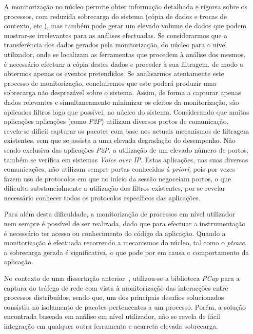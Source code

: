A monitorização no núcleo permite obter informação detalhada e rigorsa sobre os processos, com reduzida sobrecarga do sistema (cópia de dados e trocas de contexto, etc.), mas também pode gerar um elevado volume de dados que podem mostrar-se irrelevantes para as análises efectuadas.
Se considerarmos que a transferência dos dados gerados pela monitorização, do núcleo para o nível utilizador, onde se localizam as ferramentas que procedem à análise dos mesmos, é necessário efectuar a cópia destes dados e proceder à sua filtragem, de modo a obtermos apenas os eventos pretendidos.
Se analisarmos atentamente este processo de monitorização, concluiremos que este poderá produzir uma sobrecarga não desprezável sobre o sistema.
Assim, de forma a capturar apenas dados relevantes e simultaneamente minimizar os efeitos da monitorização, são aplicados filtros logo que possível, no núcleo do sistema.
Considerando que muitas aplicações aplicações (como \textit{P2P}) utilizam diversos portos de comunicação, revela-se difícil capturar os pacotes com base nos actuais mecanismos de filtragem existentes, sem que se assista a uma elevada degradação do desempenho.
Não sendo exclusiva das aplicações \textit{P2P}, a utilização de um elevado número de portos, também se verifica em sistemas \textit{Voice over IP}.
Estas aplicações, nas suas diversas comunicações, não utilizam sempre portas conhecidas \textit{à priori}, pois por vezes fazem uso de protocolos em que no início da sessão negoceiam portos, o que dificulta substancialmente a utilização dos filtros existentes, por se revelar necessário conhecer todos os protocolos específicos das aplicações.


 Para além desta dificuldade, a monitorização de processos em nível utilizador nem sempre é possível de ser realizada, dado que para efectuar a instrumentação é necessário ter acesso ou conhecimento do código da aplicação.
Quando a monitorização é efectuada recorrendo a mecanismos do núcleo, tal como o \textit{ptrace}, a sobrecarga gerada é significativa, o que pode por em causa o comportamento da aplicação.


No contexto de uma dissertação anterior~\cite{Farruca:2009}, utilizou-se a biblioteca \textit{PCap} para a captura do tráfego de rede com vista à monitorização das interacções entre processos distribuídos, sendo que, um dos principais desafios solucionados consistiu no isolamento de pacotes pertencentes a um processo.
Porém, a solução encontrada baseada em análise em nível utilizador, não se revela de fácil integração em qualquer outra ferramenta e acarreta elevada sobrecarga.

